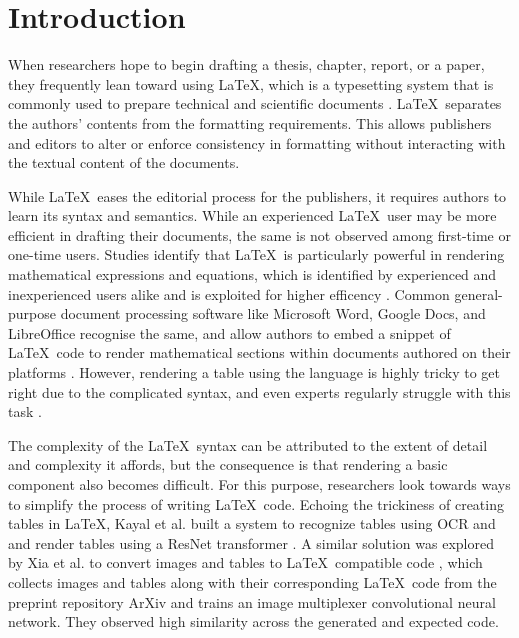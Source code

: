 \section{Introduction}

When researchers hope to begin drafting a thesis, chapter, report, or a paper, they frequently lean toward using \LaTeX, which is a typesetting system that is commonly used to prepare technical and scientific documents \cite{latex}.
\LaTeX\ separates the authors' contents from the formatting requirements.
This allows publishers and editors to alter or enforce consistency in formatting without interacting with the textual content of the documents.

While \LaTeX\ eases the editorial process for the publishers, it requires authors to learn its syntax and semantics.
While an experienced \LaTeX\ user may be more efficient in drafting their documents, the same is not observed among first-time or one-time users.
Studies identify that \LaTeX\ is particularly powerful in rendering mathematical expressions and equations, which is identified by experienced and inexperienced users alike and is exploited for higher efficency \cite{knauff_efficiency_2014}.
Common general-purpose document processing software like Microsoft Word, Google Docs, and LibreOffice recognise the same, and allow authors to embed a snippet of \LaTeX\ code to render mathematical sections within documents authored on their platforms \cite{matthews_craft_2019}.
However, rendering a table using the language is highly tricky to get right due to the complicated syntax, and even experts regularly struggle with this task \cite{knauff_efficiency_2014}.

The complexity of the \LaTeX\ syntax can be attributed to the extent of detail and complexity it affords, but the consequence is that rendering a basic component also becomes difficult.
For this purpose, researchers look towards ways to simplify the process of writing \LaTeX\ code.
Echoing the trickiness of creating tables in \LaTeX, Kayal et al. built a system to recognize tables using OCR and and render tables using a ResNet transformer \cite{kayal_tables_2023}.
A similar solution was explored by Xia et al. to convert images and tables to \LaTeX\ compatible code \cite{xia_latexnet_2025}, which collects images and tables along with their corresponding \LaTeX\ code from the preprint repository ArXiv and trains an image multiplexer convolutional neural network.
They observed high similarity across the generated and expected code.

